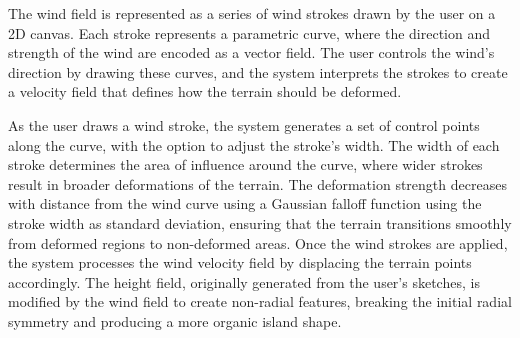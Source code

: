 The wind field is represented as a series of wind strokes drawn by the user on a 2D canvas. Each stroke represents a parametric curve, where the direction and strength of the wind are encoded as a vector field. The user controls the wind's direction by drawing these curves, and the system interprets the strokes to create a velocity field that defines how the terrain should be deformed.

As the user draws a wind stroke, the system generates a set of control points along the curve, with the option to adjust the stroke's width. The width of each stroke determines the area of influence around the curve, where wider strokes result in broader deformations of the terrain.
The deformation strength decreases with distance from the wind curve using a Gaussian falloff function using the stroke width as standard deviation, ensuring that the terrain transitions smoothly from deformed regions to non-deformed areas.
Once the wind strokes are applied, the system processes the wind velocity field by displacing the terrain points accordingly. The height field, originally generated from the user's sketches, is modified by the wind field to create non-radial features, breaking the initial radial symmetry and producing a more organic island shape.










